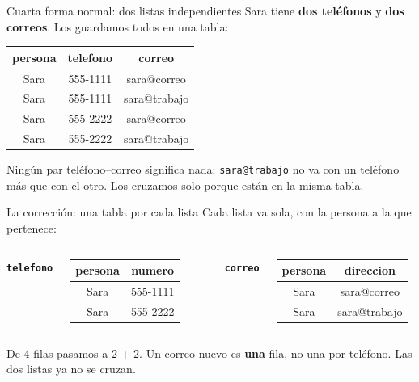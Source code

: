 \documentclass[aspectratio=169,10pt,c]{beamer}
\newcommand{\fn}[1]{\tikz[baseline=-0.5ex]{\node[rounded corners=2pt,fill=utpRojo,text=white,
  font=\bfseries\small,inner xsep=6pt,inner ysep=3pt] {#1};}}
\newcommand{\tblb}[1]{\textcolor{utpNaranja}{\textbf{\texttt{#1}}}}
\begin{document}
\begin{frame}{\fn{4FN} Cuarta forma normal: dos listas independientes}
\small Sara tiene \textbf{dos teléfonos} y \textbf{dos correos}. Los guardamos todos en una tabla:
\vspace{0.2cm}
\begin{center}
\footnotesize
\begin{tabular}{ccc}
\toprule
\bfseries persona & \bfseries telefono & \bfseries correo \\
\midrule
Sara & 555-1111 & sara@correo \\
Sara & 555-1111 & sara@trabajo \\
Sara & 555-2222 & sara@correo \\
Sara & 555-2222 & sara@trabajo \\
\bottomrule
\end{tabular}
\end{center}
\vspace{0.25cm}
\small Ningún par teléfono--correo significa nada: \texttt{sara@trabajo} no va con un teléfono más que con el otro. Los cruzamos solo porque están en la misma tabla.
\vspace{0.15cm}
\end{frame}

\begin{frame}{\fn{4FN} La corrección: una tabla por cada lista}
\small Cada lista va sola, con la persona a la que pertenece:
\vspace{0.3cm}
\begin{columns}[T,onlytextwidth]
\centering\footnotesize\tblb{telefono}\\[3pt]
\begin{tabular}{cc}
\toprule
\bfseries persona & \bfseries numero \\
\midrule
Sara & 555-1111 \\
Sara & 555-2222 \\
\bottomrule
\end{tabular}
\centering\footnotesize\tblb{correo}\\[3pt]
\begin{tabular}{cc}
\toprule
\bfseries persona & \bfseries direccion \\
\midrule
Sara & sara@correo \\
Sara & sara@trabajo \\
\bottomrule
\end{tabular}
\end{columns}
\vspace{0.35cm}
\small De 4 filas pasamos a 2 + 2. Un correo nuevo es \textbf{una} fila, no una por teléfono. Las dos listas ya no se cruzan.
\end{frame}
\end{document}
